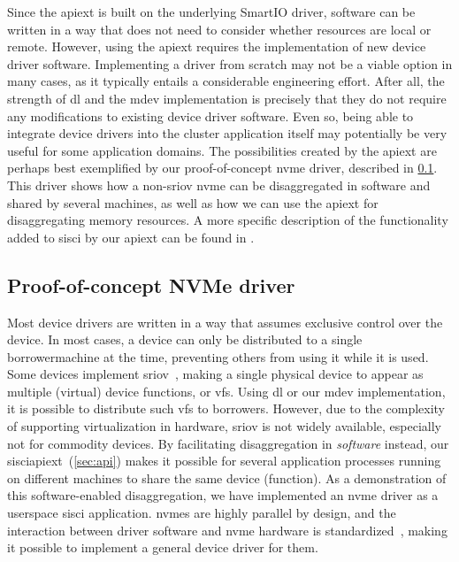 Since the \gls{apiext} is built on the underlying SmartIO driver, software can be written in a way that does not need to consider whether resources are local or remote.
%
However, using the \gls{apiext} requires the implementation of new device driver software.
%
Implementing a driver from scratch may not be a viable option in many cases, as it typically entails a considerable engineering effort.
%
After all, the strength of \gls{dl} and the \gls{mdev} implementation is precisely that they do not require any modifications to existing device driver software.
%
Even so, being able to integrate device drivers into the cluster application itself may potentially be very useful for some application domains.
%
The possibilities created by the \gls{apiext} are perhaps best exemplified by our proof-of-concept \gls{nvme} driver, described in \cref{sec:nvme-driver}.
%
This driver shows how a non-\gls{sriov} \gls{nvme} can be \gls{disaggregated} in software and shared by several machines, as well as how we can use the \gls{apiext} for \gls{disaggregating} memory resources.
%
A more specific description of the functionality added to \gls{sisci} by our \gls{apiext} can be found in .



\subsection{Proof-of-concept NVMe driver}\label{sec:nvme-driver}
Most device drivers are written in a way that assumes exclusive control over the device.
%
In most cases, a device can only be distributed to a single \gls{borrowermachine} at the time, preventing others from using it while it is used.
%
Some devices implement \gls{sriov}~\cite{spec:SRIOV}, making a single physical device to appear as multiple (virtual) device functions, or \glspl{vf}.
%
Using \gls{dl} or our \gls{mdev} implementation, it is possible to distribute such \glspl{vf} to \glspl{borrower}.
%
However, due to the complexity of supporting virtualization in hardware, \gls{sriov} is not widely available, especially not for commodity devices.
%
By facilitating \gls{disaggregation} in \emph{software} instead, our \gls{sisciapiext}~(\cref{sec:api}) makes it possible for several application processes running on different machines to share the same device (\gls{function}).
%
As a demonstration of this software-enabled \gls{disaggregation}, we have implemented an \gls{nvme} driver as a \gls{userspace} \gls{sisci} application.
%
\Glspl{nvme} are highly parallel by design, and the interaction between driver software and \gls{nvme} hardware is standardized~\cite{spec:NVMe}, making it possible to implement a general device driver for them.


